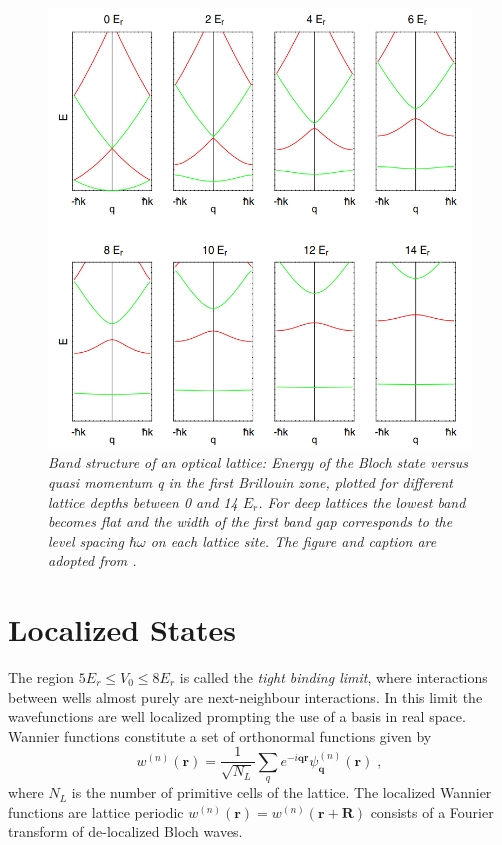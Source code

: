 \begin{figure}[!h]
	\centering
	\includegraphics[width=0.9\columnwidth]{Figures/blochbands.png} 
	\caption{\textit{Band structure of an optical lattice: Energy of the Bloch state 		versus quasi momentum q in the first Brillouin zone, plotted for different 				lattice depths between 0 and 14 $E_r$. For deep lattices the lowest band 				becomes flat and the width of the first band gap corresponds to the level 				spacing $\hbar \omega$ on each lattice site. The figure and caption are 				adopted from \cite{greiner}.}}
	\label{fig:blochbands} 
\end{figure}


\section{Localized States}
The region $5 E_r \leq V_0 \leq 8 E_r$ is called the \textit{tight binding limit}, where interactions between wells almost purely are next-neighbour interactions. In this limit the wavefunctions are well localized prompting the use of a basis in real space. Wannier functions constitute a set of orthonormal functions given by
\begin{equation}
	w^{(n)}(\boldsymbol{r}) = \frac{1}{\sqrt{N_L}} \sum_{q} e^{ -i \boldsymbol{q} \boldsymbol{r} } \psi_{\boldsymbol{q}}^{(n)}(\boldsymbol{r}) \; ,
\end{equation} 
where $N_L$ is the number of primitive cells of the lattice. The localized Wannier functions are lattice periodic $w^{(n)}(\boldsymbol{r}) = w^{(n)}(\boldsymbol{r} + \boldsymbol{R})$ consists of a Fourier transform of de-localized Bloch waves. \cite{manybodyBloch}
